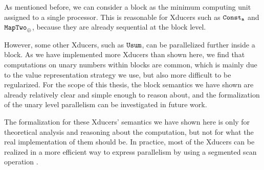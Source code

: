 As mentioned before, we can consider a block  as the minimum computing unit assigned to a single processor. This is reasonable for
Xducers such as $\mathtt{Const_{a}}$ and $\mathtt{MapTwo}_{\oplus}$, because
they are already sequential at the block level. 

However, some other Xducers, such as $\mathtt{Usum}$, can be parallelized further inside a block.
As we have implemented more Xducers than shown here, we find that computations on unary numbers within blocks are common, which is mainly due to the value representation strategy we use, but also more difficult to be regularized.
For the scope of this thesis, the block semantics we have shown are already relatively clear and simple enough to reason about, and the formalization of the unary level parallelism can be investigated in future work. 


The formalization for these Xducers' semantics we have shown here is only for theoretical analysis and reasoning about the computation, but not for what the real implementation of them should be. 
In practice, most of the Xducers can be realized in a more efficient way to express parallelism by using a segmented scan operation \cite{blel89scan}. 

%
%
%
%
%
%
%
%
%
%
%
%
%

